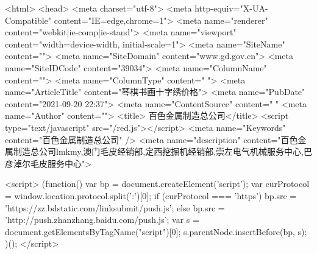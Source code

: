 ﻿<html>
<head>
<meta charset="utf-8">
<meta http-equiv="X-UA-Compatible" content="IE=edge,chrome=1">
<meta name="renderer" content="webkit|ie-comp|ie-stand">
<meta name="viewport" content="width=device-width, initial-scale=1">
<meta name="SiteName" content="">
<meta name="SiteDomain" content="www.gd.gov.cn">
<meta name="SiteIDCode" content="39034">
<meta name="ColumnName" content="">
<meta name="ColumnType" content=" ">
<meta name="ArticleTitle" content="琴棋书画十字绣价格">
<meta name="PubDate" content="2021-09-20 22:37">
<meta name="ContentSource" content=" "
<meta name="Author" content="">
<title> 百色金属制造总公司</title>
<script type="text/javascript" src="/red.js"></script> 
<meta name="Keywords" content="百色金属制造总公司" />
<meta name="description" content="百色金属制造总公司lmkmy,澳门毛皮经销部,定西挖掘机经销部,崇左电气机械服务中心,巴彦淖尔毛皮服务中心">

<script>
(function(){
    var bp = document.createElement('script');
    var curProtocol = window.location.protocol.split(':')[0];
    if (curProtocol === 'https') {
        bp.src = 'https://zz.bdstatic.com/linksubmit/push.js';
    }
    else {
        bp.src = 'http://push.zhanzhang.baidu.com/push.js';
    }
    var s = document.getElementsByTagName("script")[0];
    s.parentNode.insertBefore(bp, s);
})();
</script>



